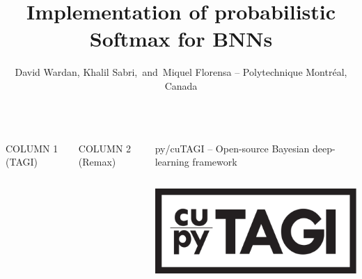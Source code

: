 \documentclass[final]{beamer}
\title{Implementation of probabilistic Softmax for BNNs}
\author{David Wardan, Khalil Sabri, \,and\, Miquel Florensa  -- Polytechnique Montr\'{e}al, Canada}
\institute[shortinst]{}
\begin{document}
\begin{frame}[t]

\begin{columns}
\begin{column}[T]{.31\textwidth}

{\Large COLUMN 1 (TAGI)}


\end{column}
\begin{column}[T]{.31\textwidth}

{\Large COLUMN 2 (Remax)}


\end{column}
\begin{column}[T]{.31\textwidth}



\begin{block}{py/cuTAGI -- Open-source Bayesian deep-learning framework}\vspace{0pt}\centering


\begin{columns}
\begin{column}{.35\textwidth}\centering\bigskip


\bigskip


\medskip


\includegraphics[width=115mm]{Figures/cupyTAGI.pdf}\\[20pt]



\end{column}
\end{columns}
\end{block}
\end{column}
\end{columns}
\end{frame}
\end{document}
